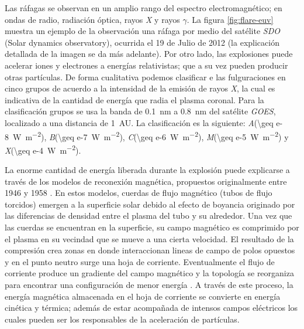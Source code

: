 Las ráfagas se observan en un amplio rango del espectro electromagnético; en ondas de radio, radiación óptica, rayos \emph{X} y rayos $\gamma$. La figura \ref{fig:flare-euv} muestra un ejemplo de la observación una ráfaga por medio del satélite \emph{SDO} (Solar dynamics observatory), ocurrida el \num{19} de Julio de \num{2012} (la explicación detallada de la imagen se da más adelante). Por otro lado, las explosiones puede acelerar iones y electrones a energías relativistas; que a su vez pueden producir otras partículas. De forma cualitativa podemos clasificar e las fulguraciones en cinco grupos de acuerdo a la intensidad de la emisión de rayos \emph{X}, la cual es indicativa de la cantidad de energía que radia el plasma coronal. Para la clasificación grupos se usa la banda de \SI{0.1}{\nano\metre} a \SI{0.8}{\nano\metre} del satélite \emph{GOES}, localizado a una distancia de \SI{1}{AU}. La clasificación es la siguiente: \emph{A}(\SI{\geq e-8}{\watt\per\square\metre}), \emph{B}(\SI{\geq e-7}{\watt\per\square\metre}), \emph{C}(\SI{\geq e-6}{\watt\per\square\metre}), \emph{M}(\SI{\geq e-5}{\watt\per\square\metre}) y \emph{X}(\SI{\geq e-4}{\watt\per\square\metre}).

La enorme cantidad de energía liberada durante la explosión puede explicarse a través de los modelos de reconexión magnética, propuestos originalmente entre \num{1946} y \num{1958} \cite{giovanelli,hoyle,sweet,parker}. En estos modelos, cuerdas de flujo magnético (tubos de flujo torcidos) emergen a la superficie solar debido al efecto de boyancia originado por las diferencias de densidad entre el plasma del tubo y su alrededor. Una vez que las cuerdas se encuentran en la superficie, su campo magnético es comprimido por el plasma en su vecindad que se mueve a una cierta velocidad. El resultado de la compresión crea zonas en donde interaccionan lineas de campo de polos opuestos y en el punto neutro surge una hoja de corriente. Eventualmente el flujo de corriente produce un gradiente del campo magnético y la topología se reorganiza para encontrar una configuración de menor energía \cite{shiba11}. A través de este proceso, la energía magnética almacenada en el hoja de corriente se convierte en energía cinética y térmica; además de estar acompañada de intensos campos eléctricos los cuales pueden ser los responsables de la aceleración de partículas.

